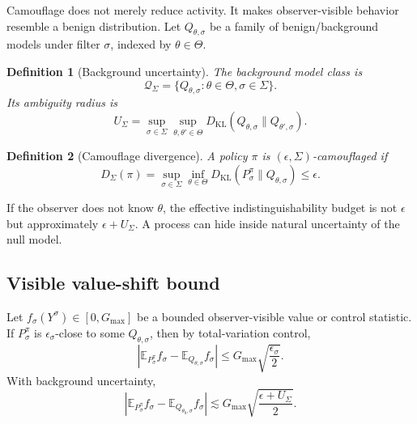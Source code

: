 \documentclass[10pt]{article}
\newtheorem{definition}{Definition}
\newcommand{\E}{\mathbb E}
\newcommand{\cQ}{\mathcal Q}
\newcommand{\KL}{D_{\mathrm{KL}}}
\begin{document}
Camouflage does not merely reduce activity. It makes observer-visible behavior resemble a benign distribution. Let \(Q_{\theta,\sigma}\) be a family of benign/background models under filter \(\sigma\), indexed by \(\theta\in\Theta\).

\begin{definition}[Background uncertainty]
The background model class is
\[
\cQ_\Sigma=\{Q_{\theta,\sigma}:\theta\in\Theta,\sigma\in\Sigma\}.
\]
Its ambiguity radius is
\begin{equation}
U_\Sigma
=
\sup_{\sigma\in\Sigma}
\sup_{\theta,\theta'\in\Theta}
\KL(Q_{\theta,\sigma}\|Q_{\theta',\sigma}).
\label{eq:background_uncertainty}
\end{equation}
\end{definition}

\begin{definition}[Camouflage divergence]
A policy \(\pi\) is \((\epsilon,\Sigma)\)-camouflaged if
\begin{equation}
D_\Sigma(\pi)
=
\sup_{\sigma\in\Sigma}
\inf_{\theta\in\Theta}
\KL(P^\pi_\sigma\|Q_{\theta,\sigma})
\le
\epsilon.
\label{eq:camouflage_div}
\end{equation}
\end{definition}

If the observer does not know \(\theta\), the effective indistinguishability budget is not \(\epsilon\) but approximately \(\epsilon+U_\Sigma\). A process can hide inside natural uncertainty of the null model.

\subsection{Visible value-shift bound}

Let \(f_\sigma(Y^\sigma)\in[0,G_{\max}]\) be a bounded observer-visible value or control statistic. If \(P^\pi_\sigma\) is \(\epsilon_\sigma\)-close to some \(Q_{\theta,\sigma}\), then by total-variation control,
\begin{equation}
\left|
\E_{P^\pi_\sigma}f_\sigma
-
\E_{Q_{\theta,\sigma}}f_\sigma
\right|
\le
G_{\max}\sqrt{\frac{\epsilon_\sigma}{2}}.
\label{eq:pinsker_value}
\end{equation}
With background uncertainty,
\begin{equation}
\left|
\E_{P^\pi_\sigma}f_\sigma
-
\E_{Q_{\theta_0,\sigma}}f_\sigma
\right|
\lesssim
G_{\max}\sqrt{\frac{\epsilon+U_\Sigma}{2}}.
\label{eq:background_value}
\end{equation}
\end{document}
